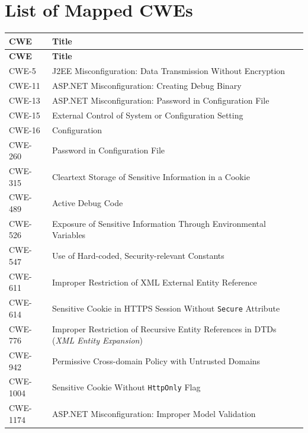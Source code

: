 \documentclass[11pt]{article}
\begin{document}
\section{List of Mapped CWEs}
\renewcommand{\arraystretch}{1.1}
\begin{longtable}{@{}p{2.2cm}p{12.2cm}@{}}
\toprule
\textbf{CWE} & \textbf{Title} \\
\midrule
\endfirsthead
\toprule
\textbf{CWE} & \textbf{Title} \\
\midrule
\endhead
\bottomrule
\endfoot

CWE-5 & J2EE Misconfiguration: Data Transmission Without Encryption \\
CWE-11 & ASP.NET Misconfiguration: Creating Debug Binary \\
CWE-13 & ASP.NET Misconfiguration: Password in Configuration File \\
CWE-15 & External Control of System or Configuration Setting \\
CWE-16 & Configuration \\
CWE-260 & Password in Configuration File \\
CWE-315 & Cleartext Storage of Sensitive Information in a Cookie \\
CWE-489 & Active Debug Code \\
CWE-526 & Exposure of Sensitive Information Through Environmental Variables \\
CWE-547 & Use of Hard-coded, Security-relevant Constants \\
CWE-611 & Improper Restriction of XML External Entity Reference \\
CWE-614 & Sensitive Cookie in HTTPS Session Without \texttt{Secure} Attribute \\
CWE-776 & Improper Restriction of Recursive Entity References in DTDs (\textit{XML Entity Expansion}) \\
CWE-942 & Permissive Cross-domain Policy with Untrusted Domains \\
CWE-1004 & Sensitive Cookie Without \texttt{HttpOnly} Flag \\
CWE-1174 & ASP.NET Misconfiguration: Improper Model Validation \\

\end{longtable}
\end{document}
